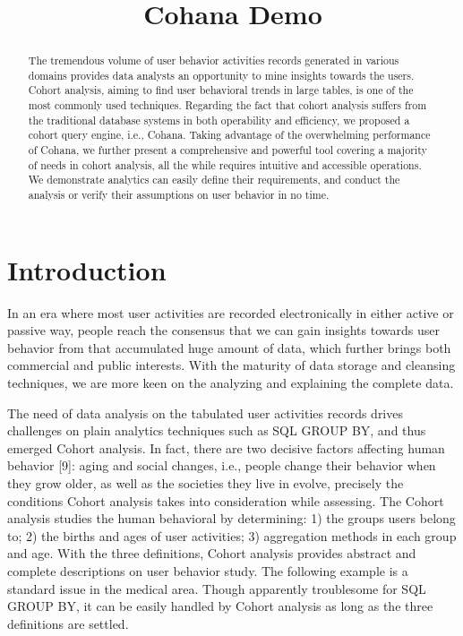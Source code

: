 \documentclass[10pt,conference,letterpaper]{IEEEtran}
\title{Cohana Demo}
\begin{document}
\maketitle
%
\begin{abstract} 
The tremendous volume of user behavior activities records generated in various domains provides data analysts an opportunity to mine insights towards the users. Cohort analysis, aiming to find user behavioral trends in large tables, is one of the most commonly used techniques. Regarding the fact that cohort analysis suffers from the traditional database systems in both operability and efficiency, we proposed a cohort query engine, i.e., Cohana. Taking advantage of the overwhelming performance of Cohana, we further present a comprehensive and powerful tool covering a majority of needs in cohort analysis, all the while requires intuitive and accessible operations. We demonstrate analytics can easily define their requirements, and conduct the analysis or verify their assumptions on user behavior in no time.
\end{abstract}

%
\section{Introduction}
%
In an era where most user activities are recorded electronically in either active or passive way, people reach the consensus that we can gain insights towards user behavior from that accumulated huge amount of data, which further brings both commercial and public interests. With the maturity of data storage and cleansing techniques, we are more keen on the analyzing and explaining the complete data.

The need of data analysis on the tabulated user activities records drives challenges on plain analytics techniques such as SQL GROUP BY, and thus emerged Cohort analysis. In fact, there are two decisive factors affecting human behavior [9]: aging and social changes, i.e., people change their behavior when they grow older, as well as the societies they live in evolve, precisely the conditions Cohort analysis takes into consideration while assessing. The Cohort analysis studies the human behavioral by determining: 1) the groups users belong to; 2) the births and ages of user activities; 3) aggregation methods in each group and age. With the three definitions, Cohort analysis provides abstract and complete descriptions on user behavior study. The following example is a standard issue in the medical area. Though apparently troublesome for SQL GROUP BY, it can be easily handled by Cohort analysis as long as the three definitions are settled.
\end{document}

